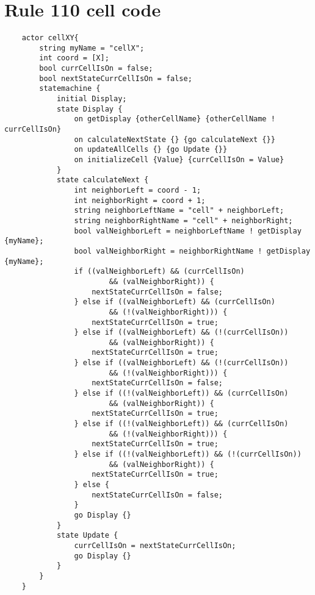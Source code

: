 \section{Rule 110 cell code}\label{sec:ProtRule110}

\begin{verbatim}
    actor cellXY{
        string myName = "cellX";
        int coord = [X];
        bool currCellIsOn = false;
        bool nextStateCurrCellIsOn = false;
        statemachine {
            initial Display;
            state Display {
                on getDisplay {otherCellName} {otherCellName ! currCellIsOn}
                on calculateNextState {} {go calculateNext {}}
                on updateAllCells {} {go Update {}}
                on initializeCell {Value} {currCellIsOn = Value}
            }
            state calculateNext {
                int neighborLeft = coord - 1;
                int neighborRight = coord + 1;
                string neighborLeftName = "cell" + neighborLeft;
                string neighborRightName = "cell" + neighborRight;
                bool valNeighborLeft = neighborLeftName ! getDisplay {myName};
                bool valNeighborRight = neighborRightName ! getDisplay {myName};
                if ((valNeighborLeft) && (currCellIsOn) 
                        && (valNeighborRight)) {
                    nextStateCurrCellIsOn = false;
                } else if ((valNeighborLeft) && (currCellIsOn) 
                        && (!(valNeighborRight))) {
                    nextStateCurrCellIsOn = true;
                } else if ((valNeighborLeft) && (!(currCellIsOn)) 
                        && (valNeighborRight)) {
                    nextStateCurrCellIsOn = true;
                } else if ((valNeighborLeft) && (!(currCellIsOn)) 
                        && (!(valNeighborRight))) {
                    nextStateCurrCellIsOn = false;
                } else if ((!(valNeighborLeft)) && (currCellIsOn) 
                        && (valNeighborRight)) {
                    nextStateCurrCellIsOn = true;
                } else if ((!(valNeighborLeft)) && (currCellIsOn) 
                        && (!(valNeighborRight))) {
                    nextStateCurrCellIsOn = true;
                } else if ((!(valNeighborLeft)) && (!(currCellIsOn)) 
                        && (valNeighborRight)) {
                    nextStateCurrCellIsOn = true;
                } else {
                    nextStateCurrCellIsOn = false;
                }
                go Display {}
            }
            state Update {
                currCellIsOn = nextStateCurrCellIsOn;
                go Display {}
            }
        }
    }
\end{verbatim}